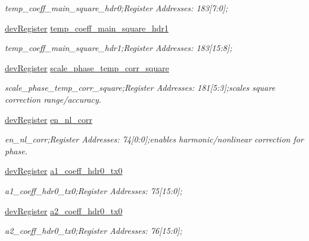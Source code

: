\begin{DoxyCompactItemize}
\begin{DoxyCompactList}\small\item\em temp\+\_\+coeff\+\_\+main\+\_\+square\+\_\+hdr0;Register Addresses\+: 183\mbox{[}7\+:0\mbox{]}; \end{DoxyCompactList}\item 
\mbox{\hyperlink{classdev_register}{dev\+Register}} \mbox{\hyperlink{class_o_p_t3101_registers_a53cc61abf2c20ed71530b12a4d8cbb5f}{temp\+\_\+coeff\+\_\+main\+\_\+square\+\_\+hdr1}}
\begin{DoxyCompactList}\small\item\em temp\+\_\+coeff\+\_\+main\+\_\+square\+\_\+hdr1;Register Addresses\+: 183\mbox{[}15\+:8\mbox{]}; \end{DoxyCompactList}\item 
\mbox{\hyperlink{classdev_register}{dev\+Register}} \mbox{\hyperlink{class_o_p_t3101_registers_a122cdf0dfa7e90063c9a351084a1c111}{scale\+\_\+phase\+\_\+temp\+\_\+corr\+\_\+square}}
\begin{DoxyCompactList}\small\item\em scale\+\_\+phase\+\_\+temp\+\_\+corr\+\_\+square;Register Addresses\+: 181\mbox{[}5\+:3\mbox{]};scales square correction range/accuracy. \end{DoxyCompactList}\item 
\mbox{\hyperlink{classdev_register}{dev\+Register}} \mbox{\hyperlink{class_o_p_t3101_registers_a64d96f648b7c2cdef2ad7152722db402}{en\+\_\+nl\+\_\+corr}}
\begin{DoxyCompactList}\small\item\em en\+\_\+nl\+\_\+corr;Register Addresses\+: 74\mbox{[}0\+:0\mbox{]};enables harmonic/nonlinear correction for phase. \end{DoxyCompactList}\item 
\mbox{\hyperlink{classdev_register}{dev\+Register}} \mbox{\hyperlink{class_o_p_t3101_registers_a089dbbc3a05800d659b51ee8634e35b6}{a1\+\_\+coeff\+\_\+hdr0\+\_\+tx0}}
\begin{DoxyCompactList}\small\item\em a1\+\_\+coeff\+\_\+hdr0\+\_\+tx0;Register Addresses\+: 75\mbox{[}15\+:0\mbox{]}; \end{DoxyCompactList}\item 
\mbox{\hyperlink{classdev_register}{dev\+Register}} \mbox{\hyperlink{class_o_p_t3101_registers_a265862cfeca774dd2845ccb4b5f2c024}{a2\+\_\+coeff\+\_\+hdr0\+\_\+tx0}}
\begin{DoxyCompactList}\small\item\em a2\+\_\+coeff\+\_\+hdr0\+\_\+tx0;Register Addresses\+: 76\mbox{[}15\+:0\mbox{]}; \end{DoxyCompactList}\item 

\end{DoxyCompactItemize}
